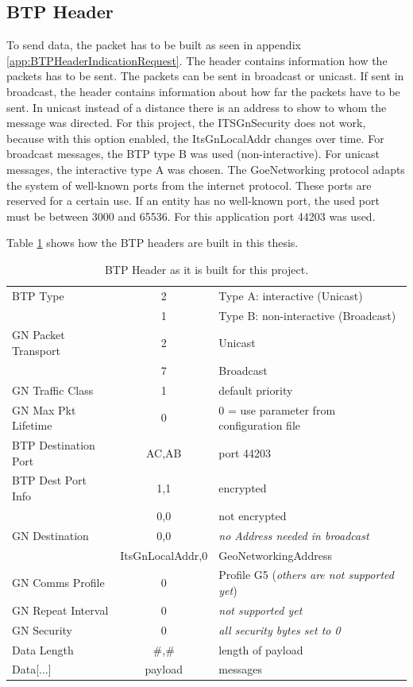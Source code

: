 \subsection{BTP Header}\label{sec:BTPHeader}

To send data, the packet has to be built as seen in appendix \ref{app:BTPHeaderIndicationRequest}. The header contains information how the packets has to be sent. The packets can be sent in broadcast or unicast. If sent in broadcast, the header contains information about how far the packets have to be sent. In unicast instead of a distance there is an address to show to whom the message was directed.
For this project, the ITSGnSecurity does not work, because with this option enabled, the ItsGnLocalAddr changes over time. For broadcast messages, the BTP type B was used (non-interactive). For unicast messages, the interactive type A was chosen. The GoeNetworking protocol adapts the system of well-known ports from the internet protocol. These ports are reserved for a certain use. If an entity has no well-known port, the used port must be between 3000 and 65536. For this application port 44203 was used.

Table \ref{tab:btp_header} shows how the BTP headers are built in this thesis. \cite{CohdaWirelessETSA}



\begin{table}
\begin{tabular}{|l|c|l|}
	\hline
	\hline
	BTP Type & 2 & Type A: interactive (Unicast) \\
	& 1 & Type B: non-interactive (Broadcast) \\ \hline
	GN Packet Transport & 2  & Unicast  \\
	& 7 &  Broadcast \\ \hline
	GN Traffic Class & 1 & default priority  \\ \hline
	GN Max Pkt Lifetime & 0 & 0 = use parameter from configuration file  \\ \hline
	BTP Destination Port & AC,AB & port 44203  \\ \hline
	BTP Dest Port Info & 1,1 & encrypted  \\ 
	& 0,0 & not encrypted  \\ \hline
	GN Destination & 0,0 & \textit{no Address needed in broadcast}  \\ 
	& ItsGnLocalAddr,0 & GeoNetworkingAddress  \\ \hline
	GN Comms Profile & 0 & Profile G5 (\textit{others are not supported yet})  \\ \hline
	GN Repeat Interval & 0 & \textit{not supported yet}  \\ \hline
	GN Security & 0 & \textit{all security bytes set to 0}  \\ \hline
	Data Length & \#,\# & length of payload  \\ \hline
	Data[...]  & payload & messages  \\ \hline
	\hline
\end{tabular}
\caption{BTP Header as it is built for this project.}
\label{tab:btp_header}
\end{table}

